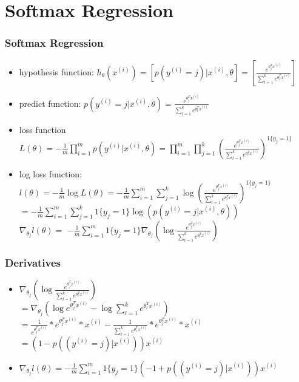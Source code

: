 
\ifx\allfiles\undefined

\fi
\section{Softmax Regression}
\begin{frame}
\frametitle{Softmax Regression}
	\small
	\begin{itemize}
		\item hypothesis function: $h_{\theta}(x^{(i)})=[p(y^{(i)}=j)|x^{(i)},\theta]=[\frac{e^{\theta_j^Tx^{(i)}}}{\sum_{l=1}^{k} e^{\theta_l ^T x^{(i)}}}]$ 
		\item predict function: $p(y^{(i)}=j|x^{(i)},\theta)=\frac{e^{\theta_j^Tx^{(i)}}}{\sum_{l=1}^{k} e^{\theta_l ^T x^{(i)}}}$\\
		\item loss function \\
			$L(\theta)=-\frac{1}{m}\prod_{i=1}^{m}p(y^{(i)}|x^{(i)},\theta)=\prod_{i=1}^{m}\prod_{j=1}^{k}(\frac{e^{\theta_j^Tx^{(i)}}}{\sum_{l=1}^{k} e^{\theta_l ^T x^{(i)}}})^{1\{y_j=1\}}$
		\item log loss function:\\
			$l(\theta)=-\frac{1}{m}\log L(\theta)=-\frac{1}{m}\sum_{i=1}^{m}\sum_{j=1}^{k}\log({\frac{e^{\theta_j^Tx^{(i)}}}{\sum_{l=1}^{k} e^{\theta_l ^T x^{(i)}}}})^{1\{y_j=1\}}$\\
			\hspace{3cm}$=-\frac{1}{m}\sum_{i=1}^{m}\sum_{j=1}^{k}{1\{y_j=1\}}\log (p(y^{(i)}=j|x^{(i)},\theta))$
		\\${\nabla}_{\theta_j}l(\theta)=$
				$-\frac{1}{m}\sum_{i=1}^{m}	{1\{y_j=1\}}
						\nabla_{\theta_j}
						(
							\log\frac
								{e^{\theta_j ^T x^{(i)}}}
								{\sum_{l=1}^{k} e^{\theta_l ^T x^{(i)}}}
						)$\
	\end{itemize}
\end{frame}
\begin{frame}
\frametitle{Derivatives}
	\small
	\begin{itemize}
	\item
		$\nabla_{\theta_j}
			(
				\log\frac
					{e^{\theta_j ^T x^{(i)}}}
					{\sum_{l=1}^{k} e^{\theta_l ^T x^{(i)}}}
			)$\\
		$=\nabla_{\theta_j}	
			(
				\log
					{e^{\theta_j ^T x^{(i)}}}
				-\log
					{\sum_{l=1}^{k} e^{\theta_l ^T x^{(i)}}}
			)$\\
		$=
				\frac{1}{e^{\theta_j ^T x^{(i)}}}
					* e^{\theta_j ^T x^{(i)}}
					* x^{(i)}
				- \frac{1}{\sum_{l=1}^{k} e^{\theta_l ^T x^{(i)}}}	
					* {e^{\theta_j ^T x^{(i)}}}
					* x^{(i)} $
		$=(1-p((y^{(i)}=j)|x^{(i)}))x^{(i)}$
	\item ${\nabla}_{\theta_j}l(\theta)=
			-\frac{1}{m}\sum_{i=1}^{m} 
			{1\{y_j=1\}}
			(-1+p((y^{(i)}=j)|x^{(i)}))x^{(i)}$
	\end{itemize}
\end{frame}
\ifx\allfiles\undefined

\fi
